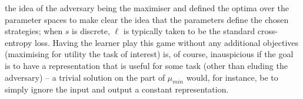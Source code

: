 the idea of the adversary being the maximiser and defined the optima over the parameter
spaces to make clear the idea that the parameters define the chosen strategies; when \(s\) is
discrete, \(\ell\) is typically taken to be the standard cross-entropy loss.
%
Having the learner play this game without any additional objectives (maximising for utility \wrt{}
the task of interest) is, of course, inauspicious if the goal is to have a representation that is
useful for some task (other than eluding the adversary) -- a trivial solution on the part of
\(\mu_{min}\) would, for instance, be to simply ignore the input and output a constant
representation.
%



%
%
%



